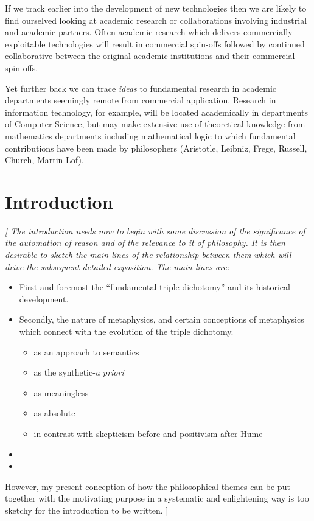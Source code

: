 If we track earlier into the development of new technologies then we are likely to find ourselved looking at academic research or collaborations involving industrial and academic partners.
Often academic research which delivers commercially exploitable technologies will result in commercial spin-offs followed by continued collaborative between the original academic institutions and their commercial spin-offs.

Yet further back we can trace {\it ideas} to fundamental research in academic departments seemingly remote from commercial application.
Research in information technology, for example, will be located academically in departments of Computer Science, but may make extensive use of theoretical knowledge from mathematics departments including mathematical logic to which fundamental contributions have been made by philosophers (Aristotle, Leibniz, Frege, Russell, Church, Martin-Lof).

\chapter{Introduction}

{\it
[
The introduction needs now to begin with some discussion of the significance of the automation of reason and of the relevance to it of philosophy.
It is then desirable to sketch the main lines of the relationship between them which will drive the subsequent detailed exposition.
The main lines are:
\begin{itemize}
\item First and foremost the ``fundamental triple dichotomy'' and its historical development.
\item Secondly, the nature of metaphysics, and certain conceptions of metaphysics which connect with the evolution of the triple dichotomy.
\begin{itemize}
\item as an approach to semantics
\item as the synthetic-\emph{a priori}
\item as meaningless
\item as absolute
\item in contrast with skepticism before and positivism after Hume
\end{itemize}
\item 
\item
\end{itemize}

However, my present conception of how the philosophical themes can be put together with the motivating purpose in a systematic and enlightening way is too sketchy for the introduction to be written.
]
}

